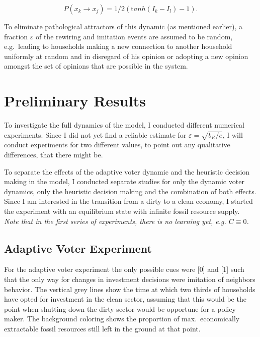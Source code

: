 \begin{equation} 
	P(x_k \rightarrow x_j) = 1/2 ({\mathrm tanh}(I_k - I_l)-1).
	\label{primitive_imitation_probability}
\end{equation}

To eliminate pathological attractors of this dynamic (as mentioned earlier), a fraction $\varepsilon$ of the rewiring and imitation events are assumed to be random, e.g.\ leading to households making a new connection to another household uniformly at random and in disregard of his opinion or adopting a new opinion amongst the set of opinions that are possible in the system.
\newpage


\section{Preliminary Results}  

To investigate the full dynamics of the model, I conducted different numerical experiments. Since I did not yet find a reliable estimate for $\varepsilon = \sqrt{b_R/e}$, I will conduct experiments for two different values, to point out any qualitative differences, that there might be.

To separate the effects of the adaptive voter dynamic and the heuristic decision making in the model, I conducted separate studies for only the dynamic voter dynamics, only the heuristic decision making and the combination of both effects. \\
Since I am interested in the transition from a dirty to a clean economy, I started the experiment with an equilibrium state with infinite fossil resource supply.\\

\textit{Note that in the first series of experiments, there is no learning yet, e.g. $C \equiv 0$.}

\subsection{Adaptive Voter Experiment}
For the adaptive voter experiment the only possible cues were [0] and [1] such that the only way for changes in investment decisions were imitation of neighbors behavior.
The vertical grey lines show the time at which two thirds of households have opted for investment in the clean sector, assuming that this would be the point when shutting down the dirty sector would be opportune for a policy maker. The background coloring shows the proportion of max.\ economically extractable fossil resources still left in the ground at that point.
